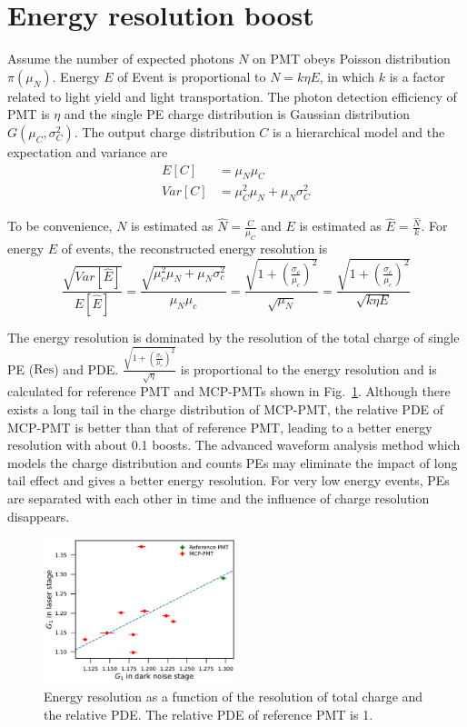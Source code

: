 \section{Energy resolution boost}
\label{Result}
Assume the number of expected photons $N$ on PMT obeys Poisson distribution $\pi(\mu_N)$. Energy $E$ of Event is proportional to $N=k\eta E$, in which $k$ is a factor related to light yield and light transportation. The photon detection efficiency of PMT is $\eta$ and the single PE charge distribution is Gaussian distribution $G(\mu_C,\sigma_C^2)$. The output charge distribution $C$ is a hierarchical model and the expectation and variance are
\begin{align}
    E[C]&=\mu_N\mu_C\\
    Var[C]&=\mu_C^2\mu_N+\mu_N\sigma_C^2
\end{align}

To be convenience, $N$ is estimated as $\hat{N}=\frac{C}{\mu_C}$ and $E$ is estimated as $\hat{E}=\frac{\hat{N}}{k}$. For  energy $E$ of events, the reconstructed energy resolution is 
\begin{equation}
    \frac{\sqrt{Var[\hat{E}]}}{E[\hat{E}]}=\frac{\sqrt{\mu_c^2\mu_N+\mu_N\sigma_c^2}}{\mu_N\mu_c}=\frac{\sqrt{1+(\frac{\sigma_c}{\mu_c})^2}}{\sqrt{\mu_N}}=\frac{\sqrt{1+(\frac{\sigma_c}{\mu_c})^2}}{\sqrt{k\eta E}}
\end{equation}

The energy resolution is dominated by the resolution of the total charge of single PE ($\mathrm{Res}$) and PDE. $\frac{\sqrt{1+(\frac{\sigma_c}{\mu_c})^2}}{\sqrt{\eta}}$ is proportional to the energy resolution and is calculated for reference PMT and MCP-PMTs shown in Fig.~\ref{fig:EnergyResolution}. Although there exists a long tail in the charge distribution of MCP-PMT, the relative PDE of MCP-PMT is better than that of reference PMT, leading to a better energy resolution with about 0.1 boosts. The advanced waveform analysis method which models the charge distribution and counts PEs may eliminate the impact of long tail effect and gives a better energy resolution. For very low energy events, PEs are separated with each other in time and the influence of charge resolution disappears.
\begin{figure}[!htbp]
    \centering
    \includegraphics[width=0.5\textwidth,page=14]{figures/result/compare.pdf}
    \caption{Energy resolution as a function of the resolution of total charge and the relative PDE. The relative PDE of reference PMT is 1.}
    \label{fig:EnergyResolution}
\end{figure}
